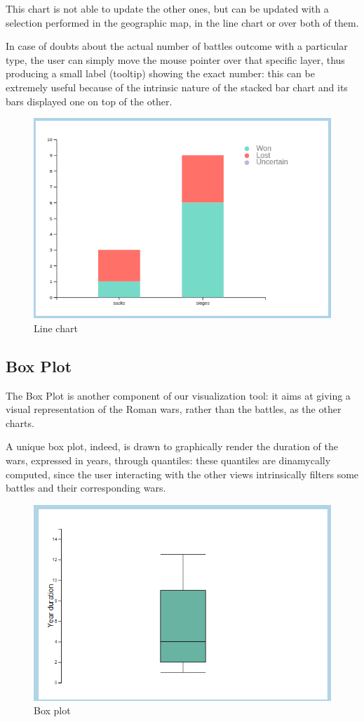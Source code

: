 This chart is not able to update the other ones, but can be updated with a selection performed in the geographic map, in the line chart or over both of them.

In case of doubts about the actual number of battles outcome with a particular type, the user can simply move the mouse pointer over that specific layer, thus producing a small label (tooltip) showing the exact number: this can be extremely useful because of the intrinsic nature of the stacked bar chart and its bars displayed one on top of the other.
\begin{figure}[h]
\centering
\includegraphics[scale=0.30]{./images/stacked_bar_chart.png}
\caption{Line chart}
\end{figure}

\subsection{Box Plot}
The Box Plot is another component of our visualization tool: it aims at giving a visual representation of the Roman wars, rather than the battles, as the other charts.

A unique box plot, indeed, is drawn to graphically render the duration of the wars, expressed in years, through quantiles: these quantiles are dinamycally computed, since the user interacting with the other views intrinsically filters some battles and their corresponding wars.
\begin{figure}[h]
    \centering
    \includegraphics[scale=0.5]{./images/box_plot.png}
    \caption{Box plot}
\end{figure}

